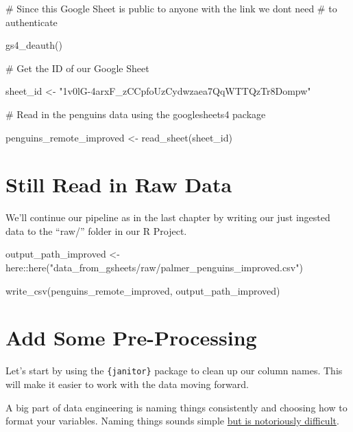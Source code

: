 \documentclass[
  letterpaper,
  DIV=11,
  numbers=noendperiod]{scrreprt}
\newenvironment{Shaded}{\begin{snugshade}}{\end{snugshade}}
\newcommand{\CommentTok}[1]{\textcolor[rgb]{0.37,0.37,0.37}{#1}}
\newcommand{\FunctionTok}[1]{\textcolor[rgb]{0.28,0.35,0.67}{#1}}
\newcommand{\NormalTok}[1]{\textcolor[rgb]{0.00,0.23,0.31}{#1}}
\newcommand{\OtherTok}[1]{\textcolor[rgb]{0.00,0.23,0.31}{#1}}
\newcommand{\SpecialCharTok}[1]{\textcolor[rgb]{0.37,0.37,0.37}{#1}}
\newcommand{\StringTok}[1]{\textcolor[rgb]{0.13,0.47,0.30}{#1}}
\begin{document}
\begin{Shaded}
\begin{Highlighting}[]
\CommentTok{\# Since this Google Sheet is public to anyone with the link we don\textquotesingle{}t need}
\CommentTok{\# to authenticate}

\FunctionTok{gs4\_deauth}\NormalTok{()}

\CommentTok{\# Get the ID of our Google Sheet}

\NormalTok{sheet\_id }\OtherTok{\textless{}{-}} \StringTok{"1v0lG{-}4arxF\_zCCpfoUzCydwzaea7QqWTTQzTr8Dompw"}

\CommentTok{\# Read in the penguins data using the googlesheets4 package}

\NormalTok{penguins\_remote\_improved }\OtherTok{\textless{}{-}} \FunctionTok{read\_sheet}\NormalTok{(sheet\_id)}
\end{Highlighting}
\end{Shaded}

\hypertarget{still-read-in-raw-data}{%
\section{Still Read in Raw Data}\label{still-read-in-raw-data}}

We'll continue our pipeline as in the last chapter by writing our just
ingested data to the ``raw/'' folder in our R Project.

\begin{Shaded}
\begin{Highlighting}[]
\NormalTok{output\_path\_improved }\OtherTok{\textless{}{-}}\NormalTok{ here}\SpecialCharTok{::}\FunctionTok{here}\NormalTok{(}\StringTok{"data\_from\_gsheets/raw/palmer\_penguins\_improved.csv"}\NormalTok{)}

\FunctionTok{write\_csv}\NormalTok{(penguins\_remote\_improved, output\_path\_improved)}
\end{Highlighting}
\end{Shaded}

\hypertarget{add-some-pre-processing}{%
\section{Add Some Pre-Processing}\label{add-some-pre-processing}}

Let's start by using the \texttt{\{janitor\}} package to clean up our
column names. This will make it easier to work with the data moving
forward.

A big part of data engineering is naming things consistently and
choosing how to format your variables. Naming things sounds simple
\href{https://www.mediawiki.org/wiki/Naming_things}{but is notoriously
difficult}.
\end{document}
